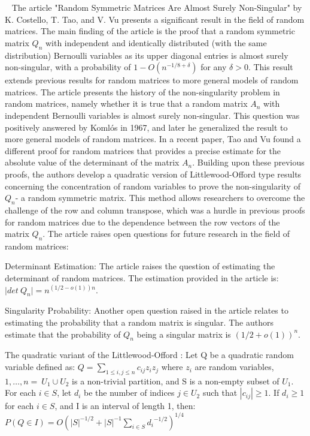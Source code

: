 


~\cite{costello2005random} The article "Random Symmetric Matrices Are Almost Surely Non-Singular"
by K. Costello, T. Tao, and V. Vu presents a significant result in the
field of random matrices. The main finding of the article is the proof
that a random symmetric matrix $ Q_n $ with independent and identically distributed 
(with the same distribution) Bernoulli variables as its upper diagonal entries
is almost surely non-singular, with a probability of $ 1-O(n^{-1/8+\delta}) $  for any $ \delta > 0 $.
This result extends previous results for random matrices to more general models of random matrices.
The article presents the history of the non-singularity problem in random matrices,
namely whether it is true that a random matrix $ A_n $ with independent Bernoulli variables
is almost surely non-singular. This question was positively answered by Komlós in 1967,
and later he generalized the result to more general models of random matrices. In a recent paper,
Tao and Vu found a different proof for random matrices that 
provides a precise estimate for the absolute value of the determinant of the matrix $ A_n $.
Building upon these previous proofs, the authors develop a quadratic version of 
Littlewood-Offord type results concerning the concentration of random variables to prove 
the non-singularity of $ Q_n $- a  random symmetric matrix.
This method allows researchers to overcome the challenge of the row and column 
transpose, which was a hurdle in previous proofs for random matrices due to the 
dependence between the row vectors of the matrix $ Q_n $.
The article raises open questions for future research in the field of random matrices:

Determinant Estimation: The article raises the question of estimating the 
determinant of random matrices. The estimation provided in the article is: $ |det\ {Q_n|=}n^{\left(1/2-o\left(1\right)\right)n} $.

Singularity Probability: Another open question raised in the article relates to estimating the 
probability that a random matrix is singular. The authors estimate that
the probability of $ Q_n $ being a singular matrix is $ {(1/2+o\left(1\right))}^n $.

The quadratic variant of the Littlewood-Offord :
Let Q be a quadratic random variable defined as: $ Q=\sum_{1\le i,j\le n}{c_{ij}z_iz_j} $  where $ z_i $
are random variables, $ {1,\ldots,n}=\ U_1\cup U_2  $
is a non-trivial partition, and S is a non-empty subset of
$ U_1 $. For each $ i\in S $, let  $d_i$  be the number of indices  $j\in U_2$ 
such that $|c_{ij}|\geq1$. If 
$ d_i\geq1$ for each $i\in S$, and I is an interval of length 1, then:
$ P\left(Q\in I\right)=O{({|S|}^{-1/2}+{|S|}^{-1}\sum_{i\in S}{d_i}^{-1/2})}^{1/4} $
